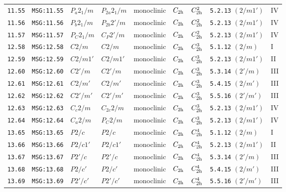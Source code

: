 \documentclass[fleqn,10pt]{jsarticle}
\begin{document}
\begin{center}
\begin{longtable}{lllllllll}
\texttt{11.55} & \texttt{MSG:11.55} & $P_{a}2_{1}/m$ & $P_{2a}2_{1}/m$ & monoclinic & $C_{\rm 2h}$ & $C_{\rm 2h}^{2}$ & \texttt{5.2.13} $(2/m1')$ & IV \\
\texttt{11.56} & \texttt{MSG:11.56} & $P_{b}2_{1}/m$ & $P_{2b}2'/m$ & monoclinic & $C_{\rm 2h}$ & $C_{\rm 2h}^{2}$ & \texttt{5.2.13} $(2/m1')$ & IV \\
\texttt{11.57} & \texttt{MSG:11.57} & $P_{C}2_{1}/m$ & $C_{P}2'/m$ & monoclinic & $C_{\rm 2h}$ & $C_{\rm 2h}^{2}$ & \texttt{5.2.13} $(2/m1')$ & IV \\ \hline
\texttt{12.58} & \texttt{MSG:12.58} & $C2/m$ & $C2/m$ & monoclinic & $C_{\rm 2h}$ & $C_{\rm 2h}^{3}$ & \texttt{5.1.12} $(2/m)$ & I \\
\texttt{12.59} & \texttt{MSG:12.59} & $C2/m1'$ & $C2/m1'$ & monoclinic & $C_{\rm 2h}$ & $C_{\rm 2h}^{3}$ & \texttt{5.2.13} $(2/m1')$ & II \\
\texttt{12.60} & \texttt{MSG:12.60} & $C2'/m$ & $C2'/m$ & monoclinic & $C_{\rm 2h}$ & $C_{\rm 2h}^{3}$ & \texttt{5.3.14} $(2'/m)$ & III \\
\texttt{12.61} & \texttt{MSG:12.61} & $C2/m'$ & $C2/m'$ & monoclinic & $C_{\rm 2h}$ & $C_{\rm 2h}^{3}$ & \texttt{5.4.15} $(2/m')$ & III \\
\texttt{12.62} & \texttt{MSG:12.62} & $C2'/m'$ & $C2'/m'$ & monoclinic & $C_{\rm 2h}$ & $C_{\rm 2h}^{3}$ & \texttt{5.5.16} $(2'/m')$ & III \\
\texttt{12.63} & \texttt{MSG:12.63} & $C_{c}2/m$ & $C_{2c}2/m$ & monoclinic & $C_{\rm 2h}$ & $C_{\rm 2h}^{3}$ & \texttt{5.2.13} $(2/m1')$ & IV \\
\texttt{12.64} & \texttt{MSG:12.64} & $C_{a}2/m$ & $P_{C}2/m$ & monoclinic & $C_{\rm 2h}$ & $C_{\rm 2h}^{3}$ & \texttt{5.2.13} $(2/m1')$ & IV \\ \hline
\texttt{13.65} & \texttt{MSG:13.65} & $P2/c$ & $P2/c$ & monoclinic & $C_{\rm 2h}$ & $C_{\rm 2h}^{4}$ & \texttt{5.1.12} $(2/m)$ & I \\
\texttt{13.66} & \texttt{MSG:13.66} & $P2/c1'$ & $P2/c1'$ & monoclinic & $C_{\rm 2h}$ & $C_{\rm 2h}^{4}$ & \texttt{5.2.13} $(2/m1')$ & II \\
\texttt{13.67} & \texttt{MSG:13.67} & $P2'/c$ & $P2'/c$ & monoclinic & $C_{\rm 2h}$ & $C_{\rm 2h}^{4}$ & \texttt{5.3.14} $(2'/m)$ & III \\
\texttt{13.68} & \texttt{MSG:13.68} & $P2/c'$ & $P2/c'$ & monoclinic & $C_{\rm 2h}$ & $C_{\rm 2h}^{4}$ & \texttt{5.4.15} $(2/m')$ & III \\
\texttt{13.69} & \texttt{MSG:13.69} & $P2'/c'$ & $P2'/c'$ & monoclinic & $C_{\rm 2h}$ & $C_{\rm 2h}^{4}$ & \texttt{5.5.16} $(2'/m')$ & III \\

\end{longtable}
\end{center}
\end{document}
